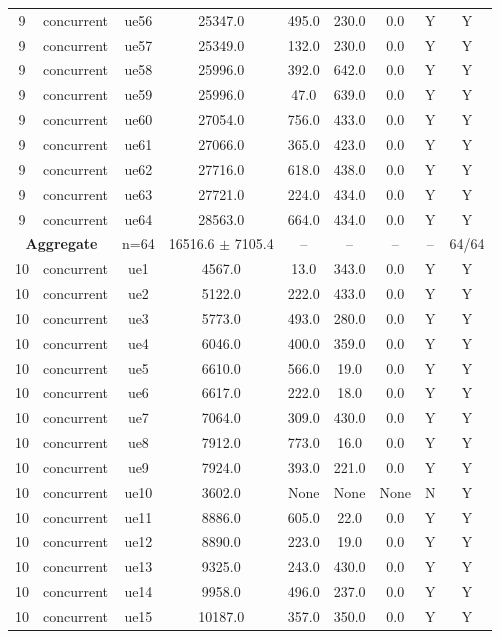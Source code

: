 \begin{table}[ht]
\begin{tabular}{|c|c|c|c|c|c|c|c|c|}
9 & concurrent & ue56 & 25347.0 & 495.0 & 230.0 & 0.0 & Y & Y \\
9 & concurrent & ue57 & 25349.0 & 132.0 & 230.0 & 0.0 & Y & Y \\
9 & concurrent & ue58 & 25996.0 & 392.0 & 642.0 & 0.0 & Y & Y \\
9 & concurrent & ue59 & 25996.0 & 47.0 & 639.0 & 0.0 & Y & Y \\
9 & concurrent & ue60 & 27054.0 & 756.0 & 433.0 & 0.0 & Y & Y \\
9 & concurrent & ue61 & 27066.0 & 365.0 & 423.0 & 0.0 & Y & Y \\
9 & concurrent & ue62 & 27716.0 & 618.0 & 438.0 & 0.0 & Y & Y \\
9 & concurrent & ue63 & 27721.0 & 224.0 & 434.0 & 0.0 & Y & Y \\
9 & concurrent & ue64 & 28563.0 & 664.0 & 434.0 & 0.0 & Y & Y \\
\multicolumn{2}{|c|}{\textbf{Aggregate}} & n=64 & 16516.6 $\pm$ 7105.4 & -- & -- & -- & -- & 64/64 \\
\hline
10 & concurrent & ue1 & 4567.0 & 13.0 & 343.0 & 0.0 & Y & Y \\
10 & concurrent & ue2 & 5122.0 & 222.0 & 433.0 & 0.0 & Y & Y \\
10 & concurrent & ue3 & 5773.0 & 493.0 & 280.0 & 0.0 & Y & Y \\
10 & concurrent & ue4 & 6046.0 & 400.0 & 359.0 & 0.0 & Y & Y \\
10 & concurrent & ue5 & 6610.0 & 566.0 & 19.0 & 0.0 & Y & Y \\
10 & concurrent & ue6 & 6617.0 & 222.0 & 18.0 & 0.0 & Y & Y \\
10 & concurrent & ue7 & 7064.0 & 309.0 & 430.0 & 0.0 & Y & Y \\
10 & concurrent & ue8 & 7912.0 & 773.0 & 16.0 & 0.0 & Y & Y \\
10 & concurrent & ue9 & 7924.0 & 393.0 & 221.0 & 0.0 & Y & Y \\
10 & concurrent & ue10 & 3602.0 & None & None & None & N & Y \\
10 & concurrent & ue11 & 8886.0 & 605.0 & 22.0 & 0.0 & Y & Y \\
10 & concurrent & ue12 & 8890.0 & 223.0 & 19.0 & 0.0 & Y & Y \\
10 & concurrent & ue13 & 9325.0 & 243.0 & 430.0 & 0.0 & Y & Y \\
10 & concurrent & ue14 & 9958.0 & 496.0 & 237.0 & 0.0 & Y & Y \\
10 & concurrent & ue15 & 10187.0 & 357.0 & 350.0 & 0.0 & Y & Y \\

\end{tabular}
\end{table}
